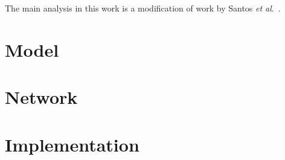 The main analysis in this work is a modification of work by Santos \textit{et al}.\ \cite{Santos2017}.
\section{Model}
\label{sec:methods_model}


\section{Network}
\label{sec:methods_network}


\section{Implementation}
\label{sec:methods_implementation}


